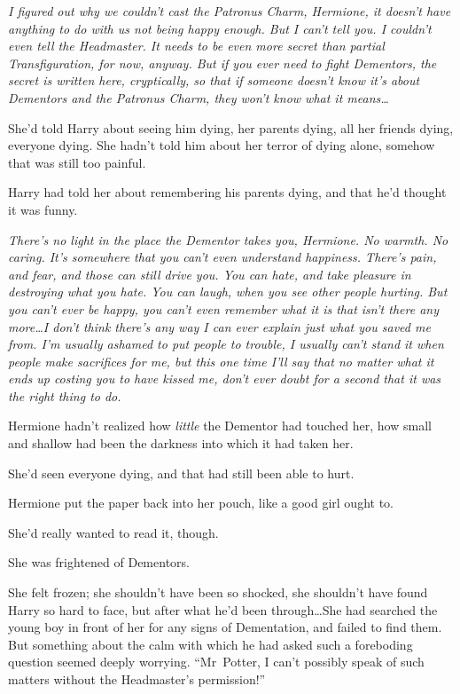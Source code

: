 \emph{I figured out why we couldn’t cast the Patronus Charm, Hermione, it doesn’t have anything to do with us not being happy enough. But I can’t tell you. I couldn’t even tell the Headmaster. It needs to be even more secret than partial Transfiguration, for now, anyway. But if you ever need to fight Dementors, the secret is written here, cryptically, so that if someone doesn’t know it’s about Dementors and the Patronus Charm, they won’t know what it means…}

She’d told Harry about seeing him dying, her parents dying, all her friends dying, everyone dying. She hadn’t told him about her terror of dying alone, somehow that was still too painful.

Harry had told her about remembering his parents dying, and that he’d thought it was funny.

\emph{There’s no light in the place the Dementor takes you, Hermione. No warmth. No caring. It’s somewhere that you can’t even understand happiness. There’s pain, and fear, and those can still drive you. You can hate, and take pleasure in destroying what you hate. You can laugh, when you see other people hurting. But you can’t ever be happy, you can’t even remember what it is that isn’t there any more…I don’t think there’s any way I can ever explain just what you saved me from. I’m usually ashamed to put people to trouble, I usually can’t stand it when people make sacrifices for me, but this one time I’ll say that no matter what it ends up costing you to have kissed me, don’t ever doubt for a second that it was the right thing to do.}

Hermione hadn’t realized how \emph{little} the Dementor had touched her, how small and shallow had been the darkness into which it had taken her.

She’d seen everyone dying, and that had still been able to hurt.

Hermione put the paper back into her pouch, like a good girl ought to.

She’d really wanted to read it, though.

She was frightened of Dementors.


She felt frozen; she shouldn’t have been so shocked, she shouldn’t have found Harry so hard to face, but after what he’d been through…She had searched the young boy in front of her for any signs of Dementation, and failed to find them. But something about the calm with which he had asked such a foreboding question seemed deeply worrying. “Mr~Potter, I can’t possibly speak of such matters without the Headmaster’s permission!”

